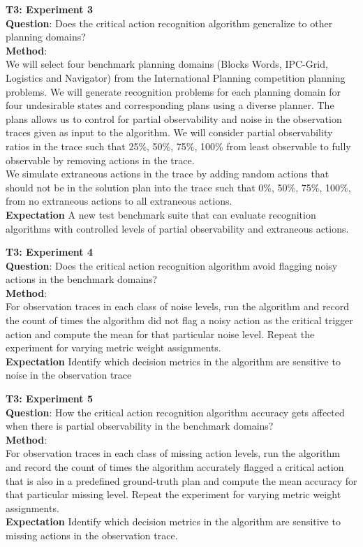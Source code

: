 \documentclass[doctor]{thesis} %
\theoremstyle{plain}
\begin{document}
\textbf{T3: Experiment 3}\\
\textbf{Question}: Does the critical action recognition algorithm generalize to other planning domains?\\
\textbf{Method}:\\
We will select four benchmark planning domains (Blocks Words, IPC-Grid, Logistics and Navigator) from the International Planning competition planning problems. We will generate recognition problems for each planning domain for four undesirable states and corresponding plans using a diverse planner. The plans allows us to control for partial observability and noise in the observation traces given as input to the algorithm. We will consider partial observability ratios in the trace such that 25\%, 50\%, 75\%, 100\% from least observable to fully observable by removing actions in the trace.\\ We simulate extraneous actions in the trace by adding random actions that should not be in the solution plan into the trace such that 0\%, 50\%, 75\%, 100\%, from no extraneous actions to all extraneous actions.\\
\textbf{Expectation} A new test benchmark suite that can evaluate recognition algorithms with controlled levels of partial observability and extraneous actions.

\textbf{T3: Experiment 4}\\
\textbf{Question}: Does the critical action recognition algorithm avoid flagging noisy actions in the benchmark domains?\\
\textbf{Method}:\\
For observation traces in each class of noise levels, run the algorithm and record the count of times the algorithm did not flag a noisy action as the critical trigger action and compute the mean for that particular noise level. Repeat the experiment for varying metric weight assignments.
\\
\textbf{Expectation} Identify which decision metrics in the algorithm are sensitive to noise in the observation trace


\textbf{T3: Experiment 5}\\
\textbf{Question}: How the critical action recognition algorithm accuracy gets affected when there is partial observability in the benchmark domains?\\
\textbf{Method}:\\
For observation traces in each class of missing action levels, run the algorithm and record the count of times the algorithm accurately flagged a critical action that is also in a predefined ground-truth plan and compute the mean accuracy for that particular missing level. Repeat the experiment for varying metric weight assignments.
\\
\textbf{Expectation} Identify which decision metrics in the algorithm are sensitive to missing actions in the observation trace.
\end{document}
